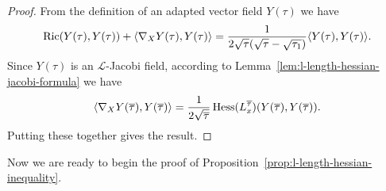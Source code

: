 \begin{proof}
\sketch

From the definition of an adapted vector field  $Y(\tau)$  we have
\begin{equation*}
\operatorname{Ric}(Y(\tau),Y(\tau)) + \langle
\nabla_{X}Y(\tau),Y(\tau)\rangle =
\frac{1}{2\sqrt{\tau}(\sqrt{\tau}-\sqrt{\tau_1})}\langle
Y(\tau),Y(\tau)\rangle.
\end{equation*}
Since $Y(\tau)$ is an ${\mathcal L}$-Jacobi field, according to
Lemma~\ref{lem:l-length-hessian-jacobi-formula} we have
$$\langle\nabla_XY(\overline\tau),Y(\overline\tau)\rangle =
\frac{1}{2\sqrt{\overline\tau}}\operatorname{Hess}(L_x^{\overline\tau})(Y(\overline\tau),Y(\overline\tau)).$$ Putting these
together gives the result.
\end{proof}

Now we are ready to begin the proof of Proposition~\ref{prop:l-length-hessian-inequality}.


